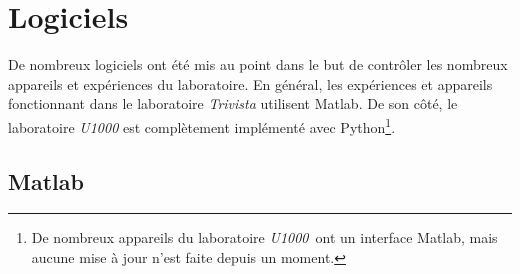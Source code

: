 \documentclass[11pt,francais]{book} %
\begin{document}




\pagestyle{empty} %

\tableofcontents %

\cleardoublepage %

\pagestyle{fancy} %


 


\chapter{Logiciels}

De nombreux logiciels ont été mis au point dans le but de contrôler les nombreux appareils et expériences du laboratoire.
En général, les expériences et appareils fonctionnant dans le laboratoire {\it Trivista} utilisent Matlab.
De son côté, le laboratoire {\it U1000} est complètement implémenté avec Python\footnote{De nombreux appareils du laboratoire {\it U1000}~ont un interface Matlab, mais aucune mise à jour n'est faite depuis un moment.}.

\section{Matlab}%
\end{document}
